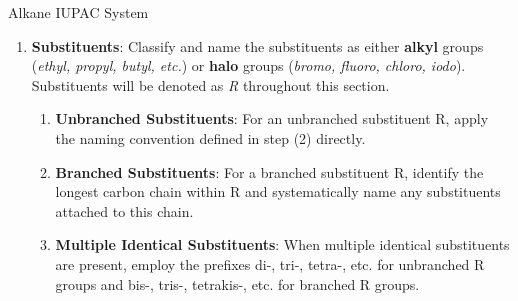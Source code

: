 \documentclass[10pt]{article}
\begin{document}
\begin{core}[label=core:alkane_iupac]{Alkane IUPAC System}
\begin{enumerate}[label=(\arabic*)]
          \item \textbf{Substituents}: Classify and name the substituents as either \textbf{alkyl} groups (\textit{ethyl, propyl, butyl, etc.}) or \textbf{halo} groups (\textit{bromo, fluoro, chloro, iodo}). Substituents will be denoted as \textit{R} throughout this section.

          \begin{enumerate}

            \item \textbf{Unbranched Substituents}: For an unbranched substituent R, apply the naming convention defined in step (2) directly.


            \item \textbf{Branched Substituents}: For a branched substituent R, identify the longest carbon chain within R and systematically name any substituents attached to this chain.


            \item \textbf{Multiple Identical Substituents}: When multiple identical substituents are present, employ the prefixes di-, tri-, tetra-, etc. for unbranched R groups and bis-, tris-, tetrakis-, etc. for branched R groups.


\end{enumerate}
\end{enumerate}
\end{core}
\end{document}
